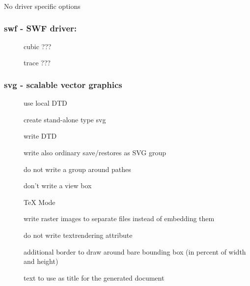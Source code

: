 \documentclass[english,a4paper]{article}
\begin{document}
No driver specific options
\subsubsection{swf - SWF driver: }
\begin{description}
\item[] 
cubic ???


\item[] 
trace ???


\end{description}
\subsubsection{svg - scalable vector graphics}
\begin{description}
\item[] 
use local DTD


\item[] 
create stand-alone type svg


\item[] 
write DTD


\item[] 
write also ordinary save/restores as SVG group


\item[] 
do not write a group around pathes


\item[] 
don't write a view box


\item[] 
TeX Mode


\item[] 
write raster images to separate files instead of embedding them


\item[] 
do not write textrendering attribute


\item[] 
additional border to draw around bare bounding box (in percent of width and height)


\item[] 
text to use as title for the generated document


\end{description}
\end{document}
